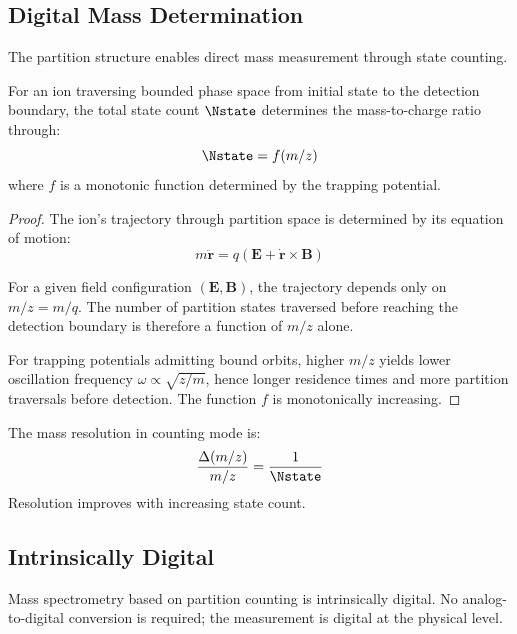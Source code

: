 \subsection{Digital Mass Determination}

The partition structure enables direct mass measurement through state counting.

\begin{theorem}
\label{thm:statemass}
For an ion traversing bounded phase space from initial state to the detection boundary, the total state count $\Nstate$ determines the mass-to-charge ratio through:
\begin{equation}
    \Nstate = f(m/z)
\end{equation}
where $f$ is a monotonic function determined by the trapping potential.
\end{theorem}

\begin{proof}
The ion's trajectory through partition space is determined by its equation of motion:
\begin{equation}
    m\ddot{\mathbf{r}} = q(\mathbf{E} + \dot{\mathbf{r}} \times \mathbf{B})
\end{equation}

For a given field configuration $(\mathbf{E}, \mathbf{B})$, the trajectory depends only on $m/z = m/q$. The number of partition states traversed before reaching the detection boundary is therefore a function of $m/z$ alone.

For trapping potentials admitting bound orbits, higher $m/z$ yields lower oscillation frequency $\omega \propto \sqrt{z/m}$, hence longer residence times and more partition traversals before detection. The function $f$ is monotonically increasing.
\end{proof}

\begin{definition}
\label{def:resolution}
The mass resolution in counting mode is:
\begin{equation}
    \frac{\Delta(m/z)}{m/z} = \frac{1}{\Nstate}
\end{equation}
Resolution improves with increasing state count.
\end{definition}

\subsection{Intrinsically Digital}

\begin{proposition}
Mass spectrometry based on partition counting is intrinsically digital. No analog-to-digital conversion is required; the measurement is digital at the physical level.
\end{proposition}

